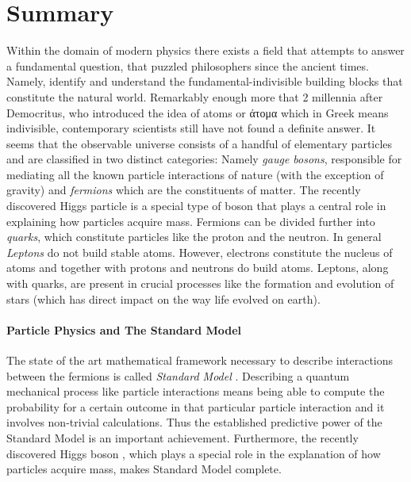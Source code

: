 \chapter*{Summary}
\chaptermark{}
%

Within the domain of modern physics there exists a field that attempts to answer a
fundamental question, that puzzled philosophers since the ancient times.
Namely, identify and understand the fundamental-indivisible building blocks that constitute the natural world.
Remarkably enough more that 2 millennia after Democritus, who introduced
the idea of atoms or \textgreek{άτομα} which in Greek means indivisible,
contemporary scientists still have not found a definite answer.
It seems that the observable universe consists of a handful of elementary particles and are
classified in two distinct categories: Namely {\it gauge bosons}, responsible for mediating all
the known particle interactions of nature (with the exception of gravity) and {\it fermions}
which are the constituents of matter. The recently discovered Higgs particle \cite{higgs-cms,higgs-atlas}
is a special type of boson that plays a central role in explaining how particles acquire mass.
Fermions can be divided further into {\it quarks}, which constitute particles like the proton and the neutron.
In general {\it Leptons} do not build stable atoms. However, electrons constitute the nucleus of atoms
and together with protons and neutrons do build atoms. Leptons, along with quarks, are present in crucial processes
like the formation and evolution of stars (which has direct impact on the way life evolved on earth).


\subsubsection{Particle Physics and The Standard Model}
The state of the art mathematical framework necessary to describe interactions between the
fermions is called \textit{Standard Model} \cite{sm-glashow,sm-weinberg,sm-salam}.
Describing a quantum mechanical process like particle interactions means being able
to compute the probability for a certain outcome in that particular particle interaction
and it involves non-trivial calculations. Thus the established predictive power of
the Standard Model is an important achievement. Furthermore, the recently
discovered Higgs boson \cite{higgs-cms,higgs-atlas}, which plays a special role in
the explanation of how particles acquire mass, makes Standard Model complete.

